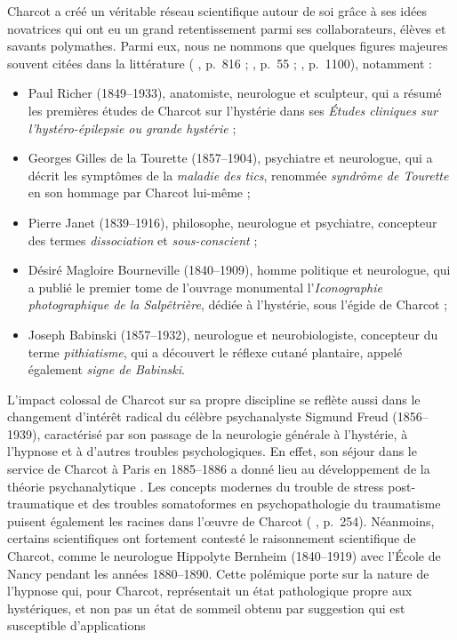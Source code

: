 Charcot a créé un véritable réseau scientifique autour de soi grâce à ses idées novatrices qui ont eu un grand retentissement parmi ses collaborateurs, élèves et savants polymathes. Parmi eux, nous ne nommons que quelques figures majeures souvent citées dans la littérature (\citeauthor{gomes2013jean} \citeyear{gomes2013jean}, p.~816 ; \citeauthor{bogousslavsky2014mysteries} \citeyear{bogousslavsky2014mysteries}, p.~55 ; \citeauthor{camargo2023} \citeyear{camargo2023}, p.~1100), notamment :
\begin{itemize}
\item Paul Richer (1849--1933), anatomiste, neurologue et sculpteur, qui a résumé les premières études de Charcot sur l'hystérie dans ses \textit{Études cliniques sur l'hystéro-épilepsie ou grande hystérie} ;
\item Georges Gilles de la Tourette (1857--1904), psychiatre et neurologue, qui a décrit les symptômes de la \textit{maladie des tics}, renommée \textit{syndrôme de Tourette} en son hommage par Charcot lui-même ;
\item Pierre Janet (1839--1916), philosophe, neurologue et psychiatre, concepteur des termes \textit{dissociation} et \textit{sous-conscient} ;
\item Désiré Magloire Bourneville (1840--1909), homme politique et neurologue, qui a publié le premier tome de l'ouvrage monumental l'\textit{Iconographie photographique de la Salpêtrière}, dédiée à l'hystérie, sous l'égide de Charcot ; 
\item Joseph Babinski (1857--1932), neurologue et neurobiologiste, concepteur du terme \textit{pithiatisme}, qui a découvert le réflexe cutané plantaire, appelé également \textit{signe de Babinski}.
\end{itemize}
\bigskip
L'impact colossal de Charcot sur sa propre discipline se reflète aussi dans le changement d'intérêt radical du célèbre psychanalyste Sigmund Freud (1856--1939), caractérisé par son passage de la neurologie générale à l'hystérie, à l'hypnose et à d'autres troubles psychologiques. En effet, son séjour dans le service de Charcot à Paris en 1885--1886 a donné lieu au développement de la théorie psychanalytique \citep[p.~41]{camargo2018jean}. Les concepts modernes du trouble de stress post-traumatique et des troubles somatoformes en psychopathologie du traumatisme puisent également les racines dans l'\oe{}uvre de Charcot (\citeauthor{white1997jean} \citeyear{white1997jean}, p.~254). Néanmoins, certains scientifiques ont fortement contesté le raisonnement scientifique de Charcot, comme le neurologue Hippolyte Bernheim (1840--1919) avec l'École de Nancy pendant les années 1880--1890. Cette polémique porte sur la nature de l'hypnose qui, pour Charcot, représentait un état pathologique propre aux hystériques, et non pas un état de sommeil obtenu par suggestion qui est susceptible d'applications
